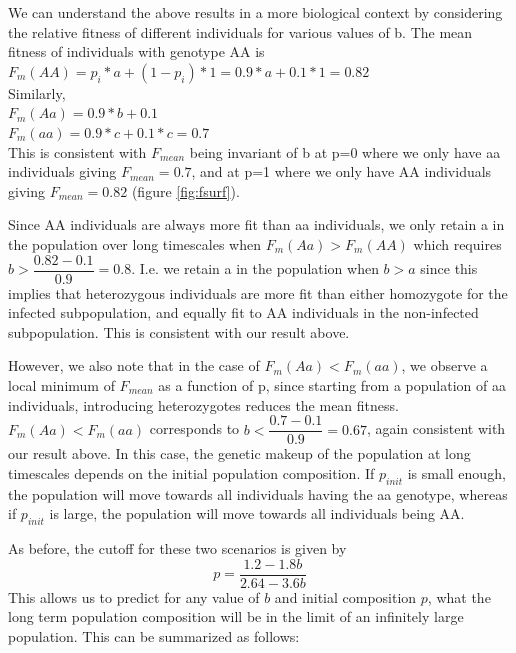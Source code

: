 \documentclass{article}
\begin{document}
We can understand the above results in a more biological context by considering the relative fitness of different individuals for various values of b.
The mean fitness of individuals with genotype AA is\\
$F_m(AA) = p_i*a + (1-p_i)*1 = 0.9*a + 0.1*1 = 0.82$\\
Similarly,\\
$F_m(Aa) = 0.9*b+0.1$\\
$F_m(aa) = 0.9*c + 0.1 * c= 0.7$\\

This is consistent with $F_{mean}$ being invariant of b at p=0 where we only have aa individuals giving $F_{mean} = 0.7$, and at p=1 where we only have AA individuals giving $F_{mean} = 0.82$ (figure \ref{fig:fsurf}).

Since AA individuals are always more fit than aa individuals, we only retain a in the population over long timescales when $F_m(Aa) > F_m(AA) $ which requires $b > \dfrac{0.82-0.1}{0.9} = 0.8$. I.e. we retain a in the population when $b > a$ since this implies that heterozygous individuals are more fit than either homozygote for the infected subpopulation, and equally fit to AA individuals in the non-infected subpopulation. This is consistent with our result above.

However, we also note that in the case of $F_m(Aa) < F_m(aa) $, we observe a local minimum of $F_{mean}$ as a function of p, since starting from a population of aa individuals, introducing heterozygotes reduces the mean fitness. $F_m(Aa) < F_m(aa) $ corresponds to $b < \dfrac{0.7-0.1}{0.9} = 0.67$, again consistent with our result above. In this case, the genetic makeup of the population at long timescales depends on the initial population composition. If $p_{init}$ is small enough, the population will move towards all individuals having the aa genotype, whereas if $p_{init}$ is large, the population will move towards all individuals being AA.

As before, the cutoff for these two scenarios is given by 
\begin{equation*}
p= \dfrac{1.2 - 1.8b}{2.64 - 3.6 b}
\end{equation*}
This allows us to predict for any value of $b$ and initial composition $p$, what the long term population composition will be in the limit of an infinitely large population. This can be summarized as follows: 
\end{document}
